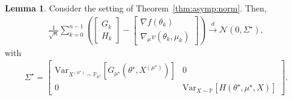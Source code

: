 \documentclass[11pt,a4paper]{article}
\theoremstyle{definition}
\newtheorem{lemma}[theorem]{Lemma}
\begin{document}
\begin{lemma}
\label{lemma:CLT:gradient:error}
Consider the setting of Theorem~\ref{thm:asymp:norm}. Then, 
\begin{align*}
    \frac{1}{\sqrt{n}} \sum_{k=0}^{n-1} \left(\begin{bmatrix}G_k \\ H_k \end{bmatrix} - \begin{bmatrix}\nabla{f}(\theta_k) \\ \nabla_\mu v(\theta_k,\mu_k)\end{bmatrix}\right) \overset{d}{\to} \mathcal N \left( 0, \Sigma^\star \right),
\end{align*}
with
\begin{align*}
    \Sigma^\star = \begin{bmatrix}
        \text{Var}_{X^{(\mu^\star)} \sim \mathbb P_{\mu^\star}}\left[ G_{\mu^\star}(\theta^\star,X^{(\mu^\star)})\right] & 0 \\ 0 & \text{Var}_{X \sim \mathbb P}\left[ H(\theta^\star, \mu^\star, X)\right]
    \end{bmatrix}.
\end{align*}
\end{lemma}
\end{document}
